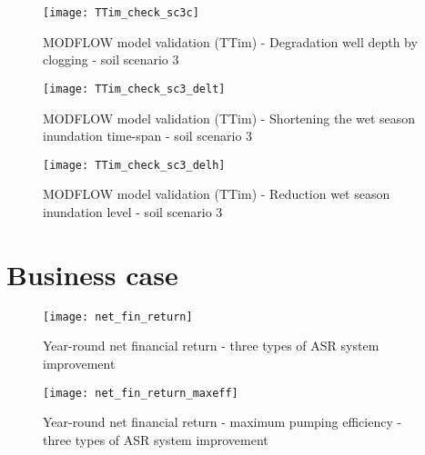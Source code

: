 \begin{figure}[h!]
 \centering
 \texttt{[image: TTim\_check\_sc3c]}
 \captionsetup{justification=centering} 
 \caption{MODFLOW model validation (TTim) - Degradation well depth by clogging - soil scenario 3}
 \label{fig:TTim_check_sc3c}
\end{figure}

\begin{figure}[h!]
 \centering
 \texttt{[image: TTim\_check\_sc3\_delt]}
 \captionsetup{justification=centering} 
 \caption{MODFLOW model validation (TTim) - Shortening the wet season inundation time-span  - soil scenario 3}
 \label{fig:TTim_check_sc3_delt}
\end{figure}

\begin{figure}[h!]
 \centering
 \texttt{[image: TTim\_check\_sc3\_delh]}
 \captionsetup{justification=centering} 
 \caption{MODFLOW model validation (TTim) - Reduction wet season inundation level  - soil scenario 3}
 \label{fig:TTim_check_sc3_delh}
\end{figure}


\newpage

\section{Business case}
\label{section:bus_case}

\begin{figure}[h!]
 \centering
 \texttt{[image: net\_fin\_return]}
 \captionsetup{justification=centering} 
 \caption{Year-round net financial return - three types of ASR system improvement}
 \label{fig:net_fin_return}
\end{figure}

\begin{figure}[h!]
 \centering
 \texttt{[image: net\_fin\_return\_maxeff]}
 \captionsetup{justification=centering} 
 \caption{Year-round net financial return - maximum pumping efficiency - three types of ASR system improvement}
 \label{fig:net_fin_return_maxeff}
\end{figure}